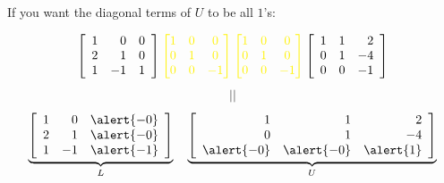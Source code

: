 \documentclass[pdf,9pt]{beamer}
\begin{document}
\begin{frame}[fragile]
    \begin{remark}
	    If you want the diagonal terms of $U$ to be all $1$'s:
      \bigskip

    \begin{align*}
	 \leftB \begin{array}{rrr}
	    1 & 0 & 0 \\
	    2 & 1 & 0 \\
	    1 & -1 & 1
	\end{array} \rightB
	\textcolor{yellow}{
	\begin{bmatrix}
	    1 & 0 & 0\\
	    0 & 1 & 0\\
	    0 & 0 & -1\\
	\end{bmatrix}
	\begin{bmatrix}
	    1 & 0 & 0\\
	    0 & 1 & 0\\
	    0 & 0 & -1\\
	\end{bmatrix}}
	\leftB \begin{array}{rrr}
	    1 & 1 & 2 \\
	    0 & 1 & -4 \\
	    0 & 0 & -1
	\end{array} \rightB
    \end{align*}
    \begin{align*}
    |  |
    \end{align*}
    \begin{align*}
    \underbrace{
	\leftB \begin{array}{rrr}
	    1 & 0  & \alert{-0} \\
	    2 & 1  & \alert{-0}\\
	    1 & -1 & \alert{-1}
  \end{array} \rightB}_{L}
  \quad
  \underbrace{
	\leftB \begin{array}{rrr}
	    1          & 1          & 2 \\
	    0          & 1          & -4 \\
	    \alert{-0} & \alert{-0} & \alert{1}
	\end{array} \rightB}_{U}
    \end{align*}
    \myQED
\end{remark}

\end{frame}
\end{document}
